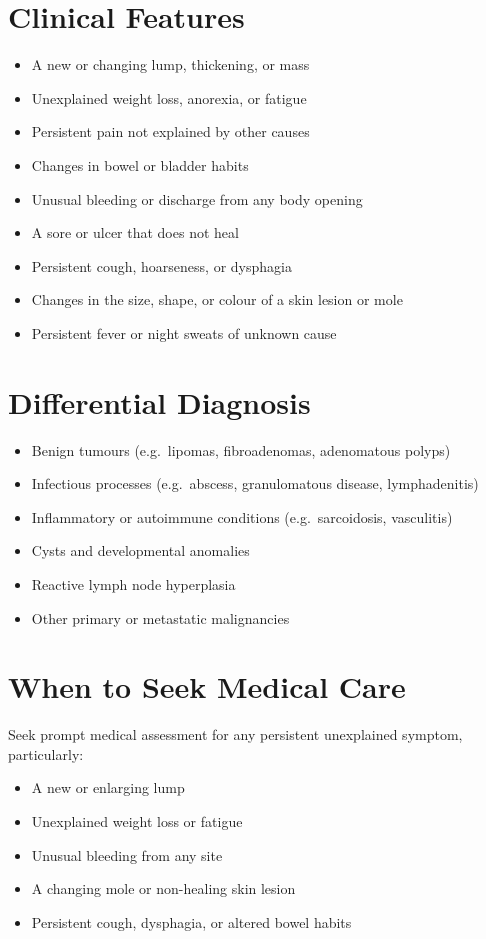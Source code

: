 \section*{Clinical Features}
\begin{itemize}
    \item A new or changing lump, thickening, or mass
    \item Unexplained weight loss, anorexia, or fatigue
    \item Persistent pain not explained by other causes
    \item Changes in bowel or bladder habits
    \item Unusual bleeding or discharge from any body opening
    \item A sore or ulcer that does not heal
    \item Persistent cough, hoarseness, or dysphagia
    \item Changes in the size, shape, or colour of a skin lesion or mole
    \item Persistent fever or night sweats of unknown cause
\end{itemize}

\section*{Differential Diagnosis}
\begin{itemize}
    \item Benign tumours (e.g.\ lipomas, fibroadenomas, adenomatous polyps)
    \item Infectious processes (e.g.\ abscess, granulomatous disease, lymphadenitis)
    \item Inflammatory or autoimmune conditions (e.g.\ sarcoidosis, vasculitis)
    \item Cysts and developmental anomalies
    \item Reactive lymph node hyperplasia
    \item Other primary or metastatic malignancies
\end{itemize}

\section*{When to Seek Medical Care}
Seek prompt medical assessment for any persistent unexplained symptom, particularly:
\begin{itemize}
    \item A new or enlarging lump
    \item Unexplained weight loss or fatigue
    \item Unusual bleeding from any site
    \item A changing mole or non-healing skin lesion
    \item Persistent cough, dysphagia, or altered bowel habits
\end{itemize}

